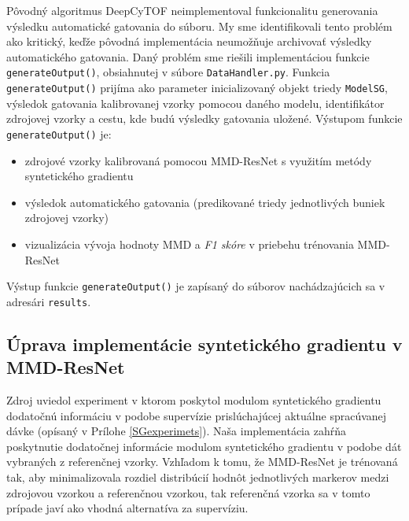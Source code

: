 Pôvodný algoritmus DeepCyTOF neimplementoval funkcionalitu generovania výsledku automatické gatovania do súboru. My sme identifikovali tento problém ako kritický, keďže pôvodná implementácia neumožňuje archivovať výsledky automatického gatovania. Daný problém sme riešili implementáciou funkcie \texttt{generateOutput()}, obsiahnutej v súbore \texttt{DataHandler.py}. Funkcia \texttt{generateOutput()} prijíma ako parameter inicializovaný objekt triedy \texttt{ModelSG}, výsledok gatovania kalibrovanej vzorky pomocou daného modelu, identifikátor zdrojovej vzorky a cestu, kde budú výsledky gatovania uložené. Výstupom funkcie \texttt{generateOutput()} je:
\begin{itemize}
    \item zdrojové vzorky kalibrovaná pomocou MMD-ResNet s využitím metódy syntetického gradientu
    \item výsledok automatického gatovania (predikované triedy jednotlivých buniek zdrojovej vzorky)
    \item vizualizácia vývoja hodnoty MMD a \textit{F1 skóre} v priebehu trénovania MMD-ResNet
\end{itemize}
Výstup funkcie \texttt{generateOutput()} je zapísaný do súborov nachádzajúcich sa v adresári \texttt{results}.

\subsection{Úprava implementácie syntetického gradientu v MMD-ResNet}
\label{uprava_implementacie_ResNet}

Zdroj \cite{Jaderberg2016} uviedol experiment v ktorom poskytol modulom syntetického gradientu dodatočnú informáciu v podobe supervízie prislúchajúcej aktuálne spracúvanej dávke (opísaný v Prílohe \ref{SGexperimets}). Naša implementácia zahŕňa poskytnutie dodatočnej informácie modulom syntetického gradientu v podobe dát vybraných z referenčnej vzorky. Vzhľadom k tomu, že MMD-ResNet je trénovaná tak, aby minimalizovala rozdiel distribúcií hodnôt jednotlivých markerov medzi zdrojovou vzorkou a referenčnou vzorkou, tak referenčná vzorka sa v tomto prípade javí ako vhodná alternatíva za supervíziu.

